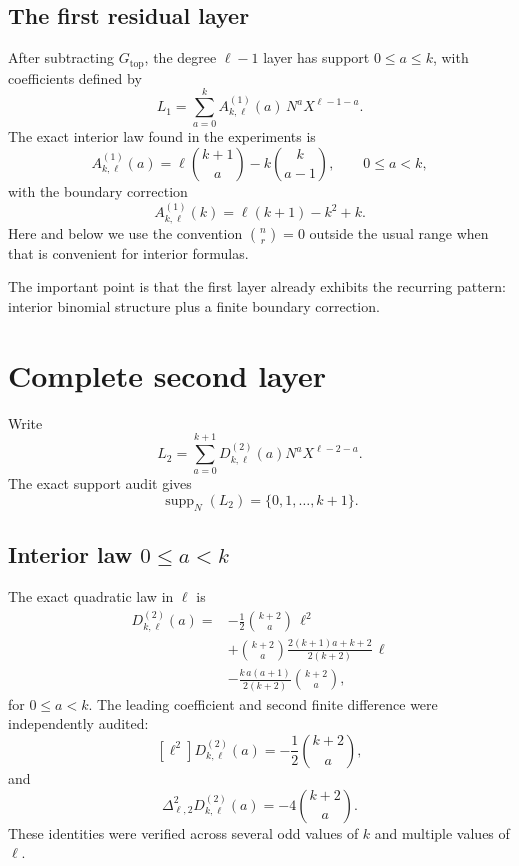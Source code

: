 \documentclass[11pt]{article}
\theoremstyle{remark}
\newcommand{\C}{\binom}
\newcommand{\Lone}{L_1}
\newcommand{\Ltwo}{L_2}
\begin{document}
\subsection{The first residual layer}

After subtracting \(G_{\mathrm{top}}\), the degree \(\ell-1\) layer has support
\(0\le a\le k\), with coefficients defined by
\[
    \Lone=\sum_{a=0}^{k} A^{(1)}_{k,\ell}(a)\,N^aX^{\ell-1-a}.
\]
The exact interior law found in the experiments is
\begin{equation}
    A^{(1)}_{k,\ell}(a)
    =\ell\C{k+1}{a}-k\C{k}{a-1},
    \qquad 0\le a<k,
\label{eq:L1-interior}
\end{equation}
with the boundary correction
\begin{equation}
    A^{(1)}_{k,\ell}(k)
    =\ell(k+1)-k^2+k.
\label{eq:L1-boundary}
\end{equation}
Here and below we use the convention \(\C{n}{r}=0\) outside the usual range when
that is convenient for interior formulas.

The important point is that the first layer already exhibits the recurring pattern:
interior binomial structure plus a finite boundary correction.

\section{Complete second layer}

Write
\[
    \Ltwo
    =\sum_{a=0}^{k+1}D^{(2)}_{k,\ell}(a)
       N^aX^{\ell-2-a}.
\]
The exact support audit gives
\[
    \operatorname{supp}_N(\Ltwo)=\{0,1,\dots,k+1\}.
\]

\subsection{Interior law \(0\le a<k\)}

The exact quadratic law in \(\ell\) is
\begin{equation}
\boxed{
\begin{aligned}
D^{(2)}_{k,\ell}(a)
={}&-\frac12\C{k+2}{a}\,\ell^2\\
&+\C{k+2}{a}
  \frac{2(k+1)a+k+2}{2(k+2)}\,\ell\\
&-\frac{k\,a(a+1)}{2(k+2)}\C{k+2}{a},
\end{aligned}}
\label{eq:L2-interior}
\end{equation}
for \(0\le a<k\).
The leading coefficient and second finite difference were independently audited:
\[
    [\ell^2]D^{(2)}_{k,\ell}(a)
    =-\frac12\C{k+2}{a},
\]
and
\[
    \Delta_{\ell,2}^2 D^{(2)}_{k,\ell}(a)
    =-4\C{k+2}{a}.
\]
These identities were verified across several odd values of \(k\) and multiple
values of \(\ell\).
\end{document}
